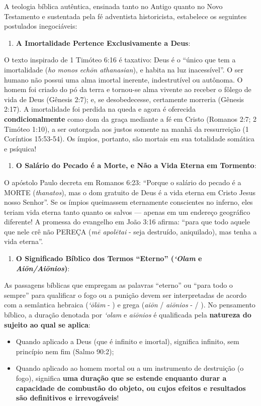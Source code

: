 A teologia bíblica autêntica, ensinada tanto no Antigo quanto no Novo Testamento e sustentada pela fé adventista historicista, estabelece os seguintes postulados inegociáveis:

\begin{enumerate}
  \item \textbf{A Imortalidade Pertence Exclusivamente a Deus}:
\end{enumerate}

O texto inspirado de 1 Timóteo 6:16 é taxativo: Deus é o ``único que tem a imortalidade (\textit{ho monos echōn athanasian}), e habita na luz inacessível''. O ser humano não possui uma alma imortal inerente, indestrutível ou autônoma. O homem foi criado do pó da terra e tornou-se alma vivente ao receber o fôlego de vida de Deus (Gênesis 2:7); e, se desobedecesse, certamente morreria (Gênesis 2:17). A imortalidade foi perdida na queda e agora é oferecida \textbf{condicionalmente} como dom da graça mediante a fé em Cristo (Romanos 2:7; 2 Timóteo 1:10), a ser outorgada aos justos somente na manhã da ressurreição (1 Coríntios 15:53-54). Os ímpios, portanto, são mortais em sua totalidade somática e psíquica!

\begin{enumerate}
  \item \textbf{O Salário do Pecado é a Morte, e Não a Vida Eterna em Tormento}:
\end{enumerate}

O apóstolo Paulo decreta em Romanos 6:23: ``Porque o salário do pecado é a MORTE (\textit{thanatos}), mas o dom gratuito de Deus é a vida eterna em Cristo Jesus nosso Senhor''. Se os ímpios queimassem eternamente conscientes no inferno, eles teriam vida eterna tanto quanto os salvos — apenas em um endereço geográfico diferente! A promessa do evangelho em João 3:16 afirma: ``para que todo aquele que nele crê não PEREÇA (\textit{mē apolētai} - seja destruído, aniquilado), mas tenha a vida eterna''.

\begin{enumerate}
  \item \textbf{O Significado Bíblico dos Termos ``Eterno'' (\textit{‘Olam} e \textit{Aiōn/Aiōnios})}:
\end{enumerate}

As passagens bíblicas que empregam as palavras ``eterno'' ou ``para todo o sempre'' para qualificar o fogo ou a punição devem ser interpretadas de acordo com a semântica hebraica (\textit{‘ōlām} - ) e grega (\textit{aiōn} / \textit{aiōnios} - / ).
No pensamento bíblico, a duração denotada por \textit{‘olam} e \textit{aiōnios} é qualificada pela \textbf{natureza do sujeito ao qual se aplica}:
\begin{itemize}
  \item Quando aplicado a Deus (que é infinito e imortal), significa infinito, sem princípio nem fim (Salmo 90:2);
  \item Quando aplicado ao homem mortal ou a um instrumento de destruição (o fogo), significa \textbf{uma duração que se estende enquanto durar a capacidade de combustão do objeto, ou cujos efeitos e resultados são definitivos e irrevogáveis}!
\end{itemize}



